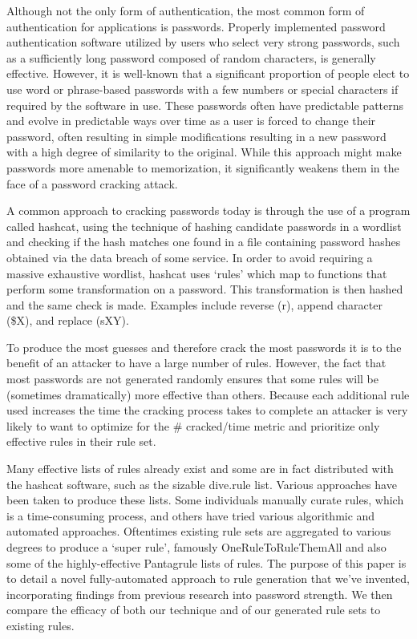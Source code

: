 \documentclass[letterpaper,twocolumn,10pt]{article}
\begin{document}
Although not the only form of authentication, the most common form of authentication for
applications is passwords. Properly implemented password authentication software utilized
by users who select very strong passwords, such as a sufficiently long password composed
of random characters, is generally effective. However, it is well-known that a significant
proportion of people elect to use word or phrase-based passwords with a few numbers or
special characters if required by the software in use. These passwords often have predictable
patterns and evolve in predictable ways over time as a user is forced to change their
password, often resulting in simple modifications resulting in a new password with a high
degree of similarity to the original.\cite{hanamsagar2018leveraging} While this approach
might make passwords more amenable to memorization, it significantly weakens them in the
face of a password cracking attack.

A common approach to cracking passwords today is through the use of a program called
hashcat, using the technique of hashing candidate passwords in a wordlist and checking
if the hash matches one found in a file containing password hashes obtained via the
data breach of some service. In order to avoid requiring a massive exhaustive wordlist,
hashcat uses `rules' which map to functions that perform some transformation on a password.
This transformation is then hashed and the same check is made. Examples include reverse (r),
append character (\$X), and replace (sXY).\cite{hashcat}


To produce the most guesses and therefore crack the most passwords it is to the benefit of
an attacker to have a large number of rules. However, the fact that most passwords are
not generated randomly ensures that some rules will be (sometimes dramatically) more effective
than others. Because each additional rule used increases the time the cracking process takes
to complete an attacker is very likely to want to optimize for the \# cracked/time metric
and prioritize only effective rules in their rule set.


Many effective lists of rules already exist and some are in fact distributed with the
hashcat software, such as the sizable dive.rule list. Various approaches have been
taken to produce these lists. Some individuals manually curate rules, which is a 
time-consuming process, and others have tried various algorithmic and automated approaches.
Oftentimes existing rule sets are aggregated to various degrees to produce a `super rule',
famously OneRuleToRuleThemAll and also some of the highly-effective Pantagrule lists of rules.\cite{ortrta}\cite{pantagrule}
The purpose of this paper is to detail a novel fully-automated approach to rule generation that
we've invented, incorporating findings from previous research into password strength. We then
compare the efficacy of both our technique and of our generated rule sets to existing rules.
\end{document}
